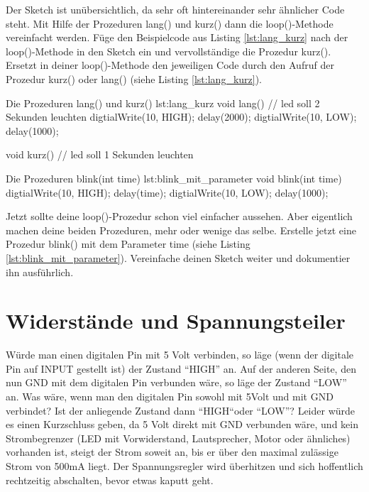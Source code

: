 Der Sketch ist unübersichtlich, da sehr oft hintereinander sehr ähnlicher Code steht. Mit Hilfe der Prozeduren lang() und kurz() dann die loop()-Methode vereinfacht werden. Füge den Beispielcode aus Listing \ref{lst:lang_kurz} nach der loop()-Methode in den Sketch ein und vervollständige die Prozedur kurz(). Ersetzt in deiner loop()-Methode den jeweiligen Code durch den Aufruf der Prozedur kurz() oder lang() (siehe Listing \ref{lst:lang_kurz}). 

\begin{multicols}{2}
\null\vfill
 
\begin{arduinoCode}{ Die Prozeduren lang() und kurz() }{lst:lang_kurz}
void lang() {
  // led soll 2 Sekunden leuchten
  digtialWrite(10, HIGH);
  delay(2000);
  digtialWrite(10, LOW);
  delay(1000);
}

void kurz() {
  // led soll 1 Sekunden leuchten
}  
\end{arduinoCode}
\vfill\null 
\columnbreak
\vfill\null 
\begin{arduinoCode}{ Die Prozeduren blink(int time) }{lst:blink_mit_parameter}
void blink(int time) {
  digtialWrite(10, HIGH);
  delay(time);
  digtialWrite(10, LOW);
  delay(1000);
}
\end{arduinoCode}
\end{multicols}

Jetzt sollte deine loop()-Prozedur schon viel einfacher aussehen. Aber eigentlich machen deine beiden Prozeduren, mehr oder wenige das selbe. Erstelle jetzt eine Prozedur blink() mit dem Parameter time (siehe Listing \ref{lst:blink_mit_parameter}). Vereinfache deinen Sketch weiter und dokumentier ihn ausführlich.

\clearpage
\section{Widerstände und Spannungsteiler}
\label{sec:spannungsteiler}
Würde man einen digitalen Pin mit 5 Volt verbinden, so läge (wenn der digitale Pin auf INPUT gestellt ist) der Zustand ``HIGH'' an. Auf der anderen Seite, den nun GND mit dem digitalen Pin verbunden wäre, so läge der Zustand ``LOW'' an. Was wäre, wenn man den digitalen Pin sowohl mit 5Volt und mit GND verbindet? Ist der anliegende Zustand dann ``HIGH``oder ``LOW''? Leider würde es einen Kurzschluss geben, da 5 Volt direkt mit GND verbunden wäre, und kein Strombegrenzer (LED mit Vorwiderstand, Lautsprecher, Motor oder ähnliches) vorhanden ist, steigt der Strom soweit an, bis er über den maximal zulässige Strom von 500mA liegt. Der Spannungsregler wird überhitzen und sich hoffentlich rechtzeitig abschalten, bevor etwas kaputt geht. 

